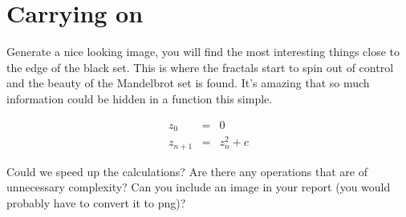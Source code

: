 \documentclass[a4paper,11pt]{article}
\begin{document}

\section{Carrying on}

Generate a nice looking image, you will find the most interesting
things close to the edge of the black set. This is where the fractals
start to spin out of control and the beauty of the Mandelbrot set is
found. It's amazing that so much information could be hidden in a
function this simple.

\begin{eqnarray*}
    z_0 &= &0 \\ 
    z_{n+1} & = &z_n^2 + c
\end{eqnarray*}

Could we speed up the calculations? Are there any operations that are
of unnecessary complexity? Can you include an image in your report
(you would probably have to convert it to png)?
\end{document}
